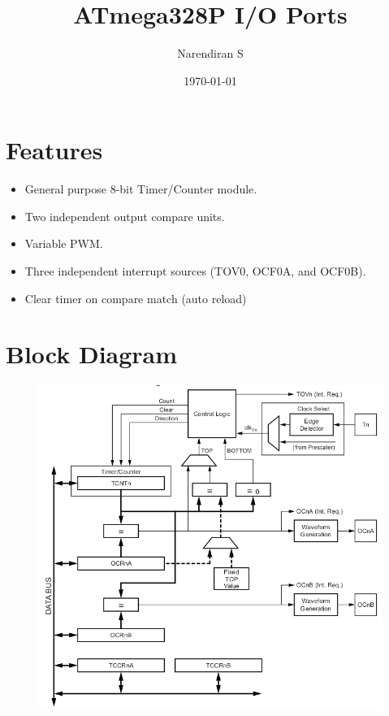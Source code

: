 \documentclass{article}
\title{ATmega328P I/O Ports}
\author{Narendiran S}
\date{\today}
\begin{document}
\maketitle

\section{Features}
\begin{itemize}
    \item General purpose 8-bit Timer/Counter module.
    \item Two independent output compare units.
    \item Variable PWM.
    \item Three independent interrupt sources (TOV0, OCF0A, and OCF0B).
    \item Clear timer on compare match (auto reload)
\end{itemize}

\section{Block Diagram}
\begin{figure}[H]
    \begin{center}
        \includegraphics[height=0.6\textheight]{Timer0BlockDiagram.png}
    \end{center}
\end{figure}
\end{document}
